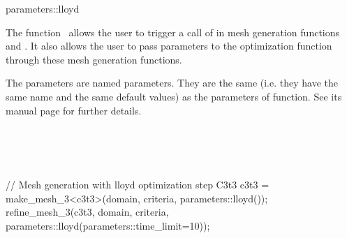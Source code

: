 \ccRefPageBegin


\begin{ccRefFunction}{parameters::lloyd}  %


\ccDefinition
  
The function \ccRefName\ allows the user to trigger a call of
 in mesh generation functions
 and . It also allows the user to pass
parameters to the optimization function 
 through these mesh generation functions.



\ccParameters

The parameters are named parameters. They are the same (i.e. they have the same
name and the same default values) as the parameters of 
function. See its manual page for further details.

\ccSeeAlso

 \\
 \\
 \\


\ccExample

\begin{ccExampleCode}
// Mesh generation with lloyd optimization step
C3t3 c3t3 = make_mesh_3<c3t3>(domain, criteria, parameters::lloyd());
refine_mesh_3(c3t3, domain, criteria, parameters::lloyd(parameters::time_limit=10));
\end{ccExampleCode}


\end{ccRefFunction}

\ccRefPageEnd

